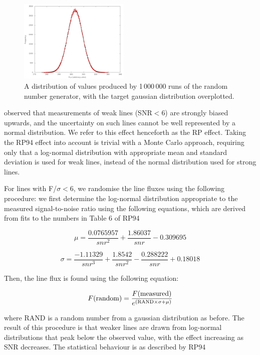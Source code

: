 \documentclass[useAMS,usenatbib]{mn2e}
\begin{document}
\begin{figure}
\includegraphics[width=0.47\textwidth]{figures/gaussian_test.png}
\caption{A distribution of values produced by 1\,000\,000 runs of the random number generator, with the target gaussian distribution overplotted.}
\label{gaussiantest}
\end{figure}


\citet[][hereafter RP94]{1994A&A...287..676R} observed that measurements of weak lines (SNR$<$6) are strongly biased upwards, and the uncertainty on such lines cannot be well represented by a normal distribution.  We refer to this effect henceforth as the RP effect.  Taking the RP94 effect into account is trivial with a Monte Carlo approach, requiring only that a log-normal distribution with appropriate mean and standard deviation is used for weak lines, instead of the normal distribution used for strong lines.

For lines with F/$\sigma < $6, we randomise the line fluxes using the following procedure: we first determine the log-normal distribution appropriate to the measured signal-to-noise ratio using the following equations, which are derived from fits to the numbers in Table 6 of RP94

\begin{equation}
\mu = \frac{0.0765957}{snr^2} + \frac{1.86037}{snr} - 0.309695
\end{equation}

\begin{equation}
\sigma = \frac{-1.11329}{snr^3} + \frac{1.8542}{snr^2} - \frac{0.288222}{snr} + 0.18018
\end{equation}

Then, the line flux is found using the following equation:

\begin{equation}
F({\rm random}) = \frac{F({\rm measured})}{e^{({\rm RAND}\times\sigma + \mu)}}
\end{equation}

where RAND is a random number from a gaussian distribution as before.  The result of this procedure is that weaker lines are drawn from log-normal distributions that peak below the observed value, with the effect increasing as SNR decreases.  The statistical behaviour is as described by RP94
\end{document}
